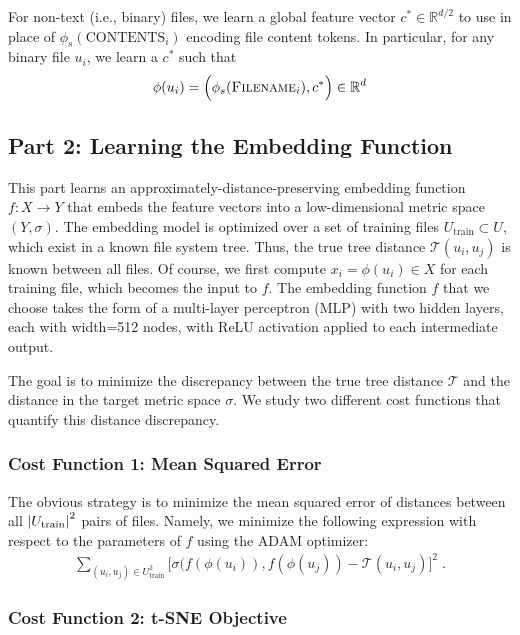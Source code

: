 \documentclass{article}
\begin{document}
For non-text (i.e., binary) files, we learn a global feature vector $c^* \in \mathbb{R}^{d/2}$ to use in place of $\phi_s(\text{CONTENTS}_i)$ encoding file content tokens. In particular, for any binary file $u_i$, we learn a $c^*$ such that
\begin{align}
  \phi(u_i) = \Big(\phi_s(\textsc{Filename}_i), c^*\Big) \in \mathbb{R}^d
\end{align}

\subsection{Part 2: Learning the Embedding Function}

This part learns an approximately-distance-preserving embedding function $f: X \to Y$ that embeds the feature vectors into a low-dimensional metric space $(Y, \sigma)$. The embedding model is optimized over a set of training files $U_\text{train} \subset U$, which exist in a known file system tree. Thus, the true tree distance $\mathcal T(u_i, u_j)$ is known between all files. Of course, we first compute $x_i = \phi(u_i) \in X$ for each training file, which becomes the input to $f$. The embedding function $f$ that we choose takes the form of a multi-layer perceptron (MLP) with two hidden layers, each with width=512 nodes, with ReLU activation applied to each intermediate output.

The goal is to minimize the discrepancy between the true tree distance $\mathcal T$ and the distance in the target metric space $\sigma$. We study two different cost functions that quantify this distance discrepancy.

\subsubsection{Cost Function 1: Mean Squared Error}

The obvious strategy is to minimize the mean squared error of distances between all $\abs{U_\text{train}}^2$ pairs of files. Namely, we minimize the following expression with respect to the parameters of $f$ using the ADAM optimizer:
\begin{align}
  \sum_{(u_i, u_j) \in U_\text{train}^2} \Big[ \sigma(f(\phi(u_i)), f(\phi(u_j)) - \mathcal T(u_i, u_j) \Big]^2 \; .
  \label{eq:mse-cost}
\end{align}

\subsubsection{Cost Function 2: t-SNE Objective}
\end{document}
